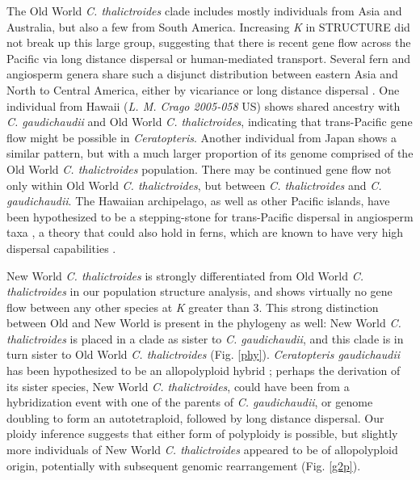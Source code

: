 \documentclass[12pt]{article}
\begin{document}
\begin{flushleft}
The Old World \textit{C. thalictroides} clade includes mostly individuals from Asia and Australia, but also a few from South America. Increasing \textit{K} in {\small{STRUCTURE}} did not break up this large group, suggesting that there is recent gene flow across the Pacific via long distance dispersal or human-mediated transport. Several fern and angiosperm genera share such a disjunct distribution between eastern Asia and North to Central America, either by vicariance or long distance dispersal \autocite{Kato1983, Les2003}. One individual from Hawaii (\textit{L. M. Crago 2005-058} US) shows shared ancestry with \textit{C. gaudichaudii} and Old World \textit{C. thalictroides}, indicating that trans-Pacific gene flow might be possible in \textit{Ceratopteris}. Another individual from Japan shows a similar pattern, but with a much larger proportion of its genome comprised of the Old World \textit{C. thalictroides} population. There may be continued gene flow not only within Old World \textit{C. thalictroides}, but between \textit{C. thalictroides} and \textit{C. gaudichaudii}. The Hawaiian archipelago, as well as other Pacific islands, have been hypothesized to be a stepping-stone for trans-Pacific dispersal in angiosperm taxa \autocite{Harbaugh2009, Wright2001}, a theory that could also hold in ferns, which are known to have very high dispersal capabilities \autocite{Barrington1993, Tryon1970}. 

New World \textit{C. thalictroides} is strongly differentiated from Old World \textit{C. thalictroides} in our population structure analysis, and shows virtually no gene flow between any other species at \textit{K} greater than 3. This strong distinction between Old and New World is present in the phylogeny as well: New World \textit{C. thalictroides} is placed in a clade as sister to \textit{C. gaudichaudii}, and this clade is in turn sister to Old World \textit{C. thalictroides} (Fig. \ref{phy}). \textit{Ceratopteris gaudichaudii} has been hypothesized to be an allopolyploid hybrid \autocite{Adjie2007}; perhaps the derivation of its sister species, New World \textit{C. thalictroides}, could have been from a hybridization event with one of the parents of \textit{C. gaudichaudii}, or genome doubling to form an autotetraploid, followed by long distance dispersal. Our ploidy inference suggests that either form of polyploidy is possible, but slightly more individuals of New World \textit{C. thalictroides} appeared to be of allopolyploid origin, potentially with subsequent genomic rearrangement (Fig. \ref{g2p}).


\end{flushleft}
\end{document}
